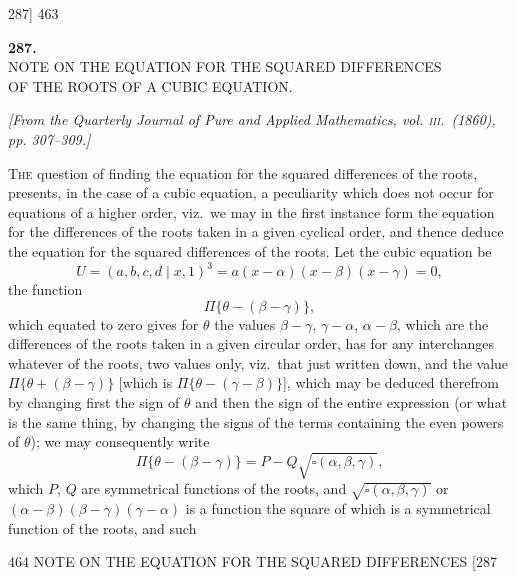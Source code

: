 \documentclass[11pt]{article}
\begin{document}
\vfill

\newpage
\begin{center}
\textsc{287]} \hfill 463
\end{center}

\bigskip

\begin{center}
\textbf{\large 287.}\\[1ex]
\textsc{NOTE ON THE EQUATION FOR THE SQUARED DIFFERENCES\\
OF THE ROOTS OF A CUBIC EQUATION.}
\end{center}

\begin{center}
\textit{[From the Quarterly Journal of Pure and Applied Mathematics, vol. \textsc{iii}.\ (1860),
pp. 307--309.]}
\end{center}

\medskip

\textsc{The} question of finding the equation for the squared differences of the roots,
presents, in the case of a cubic equation, a peculiarity which does not occur for
equations of a higher order, viz.\ we may in the first instance form the equation for
the differences of the roots taken in a given cyclical order, and thence deduce the
equation for the squared differences of the roots. Let the cubic equation be
\[ U=(a,b,c,d\mid x,1)^{3}=a(x-\alpha)(x-\beta)(x-\gamma)=0, \]
the function
\[ \Pi\{\theta-(\beta-\gamma)\}, \]
which equated to zero gives for $\theta$ the values $\beta-\gamma$, $\gamma-\alpha$, $\alpha-\beta$, which are the differences
of the roots taken in a given circular order, has for any interchanges whatever of
the roots, two values only, viz.\ that just written down, and the value $\Pi\{\theta+(\beta-\gamma)\}$ [which is $\Pi\{\theta-(\gamma-\beta)\}$],
which may be deduced therefrom by changing first the sign of $\theta$ and then the sign
of the entire expression (or what is the same thing, by changing the signs of the
terms containing the even powers of $\theta$); we may consequently write
\[ \Pi\{\theta-(\beta-\gamma)\}=P-Q\sqrt{\square(\alpha,\beta,\gamma)}, \]
which $P$, $Q$ are symmetrical functions of the roots, and $\sqrt{\square(\alpha,\beta,\gamma)}$ or $(\alpha-\beta)(\beta-\gamma)(\gamma-\alpha)$
is a function the square of which is a symmetrical function of the roots, and such

\begin{center}
464 \hfill NOTE ON THE EQUATION FOR THE SQUARED DIFFERENCES \hfill \textsc{[287}
\end{center}
\end{document}

